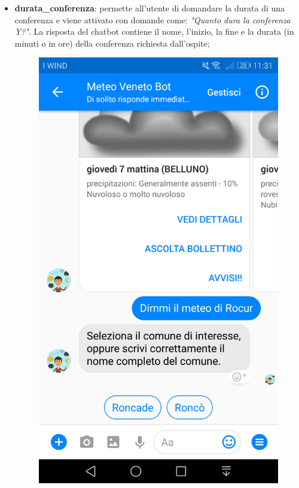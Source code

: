 \begin{itemize}
	\item \textbf{durata\_conferenza}: permette all'utente di domandare la durata di una conferenza e viene attivato con domande come: \emph{"Quanto dura la conferenza Y?"}. La risposta del \gls{chatbot} contiene il nome, l'inizio, la fine e la durata (in minuti o in ore) della conferenza richiesta dall'ospite;
	\begin{figure}[h]
		\centering
		\includegraphics[scale=0.12]{../Immagini/meteo_scelta.png}

\end{figure}
\end{itemize}
